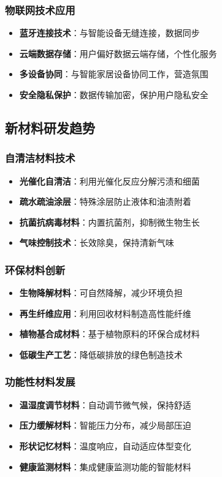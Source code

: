 \documentclass[12pt,UTF8]{ctexbook}
\begin{document}
\subsubsection{物联网技术应用}
\begin{itemize}[leftmargin=2cm]
	\item \textbf{蓝牙连接技术}：与智能设备无缝连接，数据同步
	\item \textbf{云端数据存储}：用户偏好数据云端存储，个性化服务
	\item \textbf{多设备协同}：与智能家居设备协同工作，营造氛围
	\item \textbf{安全隐私保护}：数据传输加密，保护用户隐私安全
\end{itemize}

\subsection{新材料研发趋势}
\subsubsection{自清洁材料技术}
\begin{itemize}[leftmargin=2cm]
	\item \textbf{光催化自清洁}：利用光催化反应分解污渍和细菌
	\item \textbf{疏水疏油涂层}：特殊涂层防止液体和油渍附着
	\item \textbf{抗菌抗病毒材料}：内置抗菌剂，抑制微生物生长
	\item \textbf{气味控制技术}：长效除臭，保持清新气味
\end{itemize}

\subsubsection{环保材料创新}
\begin{itemize}[leftmargin=2cm]
	\item \textbf{生物降解材料}：可自然降解，减少环境负担
	\item \textbf{再生纤维应用}：利用回收材料制造高性能纤维
	\item \textbf{植物基合成材料}：基于植物原料的环保合成材料
	\item \textbf{低碳生产工艺}：降低碳排放的绿色制造技术
\end{itemize}

\subsubsection{功能性材料发展}
\begin{itemize}[leftmargin=2cm]
	\item \textbf{温湿度调节材料}：自动调节微气候，保持舒适
	\item \textbf{压力缓解材料}：智能压力分布，减少局部压迫
	\item \textbf{形状记忆材料}：温度响应，自动适应体型变化
	\item \textbf{健康监测材料}：集成健康监测功能的智能材料
\end{itemize}
\end{document}

